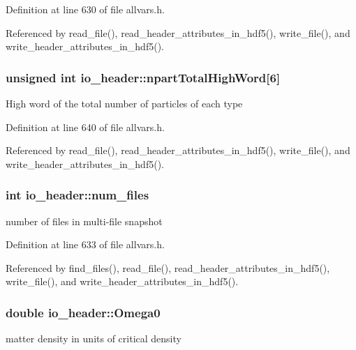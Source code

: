 Definition at line 630 of file allvars.h.



Referenced by read\_\-file(), read\_\-header\_\-attributes\_\-in\_\-hdf5(), write\_\-file(), and write\_\-header\_\-attributes\_\-in\_\-hdf5().

\hypertarget{structio__header_a56f54a68fe289b19902b3c4c561a7159}{
\subsubsection[{npartTotalHighWord}]{\setlength{\rightskip}{0pt plus 5cm}unsigned int {\bf io\_\-header::npartTotalHighWord}\mbox{[}6\mbox{]}}}
\label{structio__header_a56f54a68fe289b19902b3c4c561a7159}
High word of the total number of particles of each type 

Definition at line 640 of file allvars.h.



Referenced by read\_\-file(), read\_\-header\_\-attributes\_\-in\_\-hdf5(), write\_\-file(), and write\_\-header\_\-attributes\_\-in\_\-hdf5().

\hypertarget{structio__header_a5688351781a2845beb2c52a035cc5f71}{
\subsubsection[{num\_\-files}]{\setlength{\rightskip}{0pt plus 5cm}int {\bf io\_\-header::num\_\-files}}}
\label{structio__header_a5688351781a2845beb2c52a035cc5f71}
number of files in multi-\/file snapshot 

Definition at line 633 of file allvars.h.



Referenced by find\_\-files(), read\_\-file(), read\_\-header\_\-attributes\_\-in\_\-hdf5(), write\_\-file(), and write\_\-header\_\-attributes\_\-in\_\-hdf5().

\hypertarget{structio__header_af0d78ac0e8131523be64b3686aab9550}{
\subsubsection[{Omega0}]{\setlength{\rightskip}{0pt plus 5cm}double {\bf io\_\-header::Omega0}}}
\label{structio__header_af0d78ac0e8131523be64b3686aab9550}
matter density in units of critical density 

